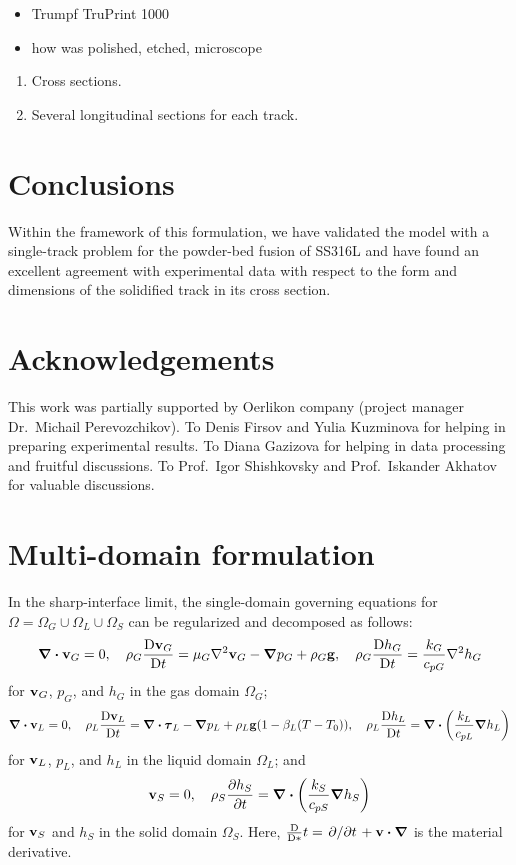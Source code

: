 \documentclass{article}
\newcommand\Dv[2][]{\frac{\mathrm{D}#1}{\mathrm{D}#2}}
\newcommand{\bv}{\vb{v}}
\newcommand{\btau}{\vb*\tau}
\begin{document}
\begin{itemize}
    \item Trumpf TruPrint 1000
    \item how was polished, etched, microscope
\end{itemize}


\begin{enumerate}
    \item Cross sections.
    \item Several longitudinal sections for each track.
\end{enumerate}

\section{Conclusions}

Within the framework of this formulation, we have validated the model with a single-track problem
for the powder-bed fusion of SS316L and have found an excellent agreement with experimental data
with respect to the form and dimensions of the solidified track in its cross section.

\section{Acknowledgements}
This work was partially supported by Oerlikon company (project manager Dr.~Michail Perevozchikov).
To Denis Firsov and Yulia Kuzminova for helping in preparing experimental results.
To Diana Gazizova for helping in data processing and fruitful discussions.
To Prof.~Igor Shishkovsky and Prof.~Iskander Akhatov for valuable discussions.

\appendix

\section{Multi-domain formulation}

In the sharp-interface limit, the single-domain governing equations for $\Omega=\Omega_G\cup\Omega_L\cup\Omega_S$ can be regularized and decomposed as follows: 
\begin{equation}
    \div\bv_G = 0, \quad
    \rho_G\Dv[\bv_G]{t} = \mu_G\laplacian\bv_G - \grad{p_G} + \rho_G\vb{g}, \quad
    \rho_G\Dv[h_G]{t} = \frac{k_G}{c_{pG}}\laplacian{h_G}
\end{equation}
for $\bv_G$, $p_G$, and $h_G$ in the gas domain $\Omega_G$;
\begin{equation}
    \div\bv_L = 0, \quad
    \rho_L\Dv[\bv_L]{t} = \div\btau_L - \grad{p_L} + \rho_L\vb{g}(1-\beta_L(T-T_0)), \quad
    \rho_L\Dv[h_L]{t} = \div(\frac{k_L}{c_{pL}}\grad{h_L})
\end{equation}
for $\bv_L$, $p_L$, and $h_L$ in the liquid domain $\Omega_L$; and
\begin{equation}
    \bv_S = 0, \quad \rho_S\pdv{h_S}{t} = \div(\frac{k_S}{c_{pS}}\grad{h_S})
\end{equation}
for $\bv_S$ and $h_S$ in the solid domain $\Omega_S$.
Here, $\Dv*{t} = \pdv*{t} + \bv\vdot\grad$ is the material derivative.
\end{document}
